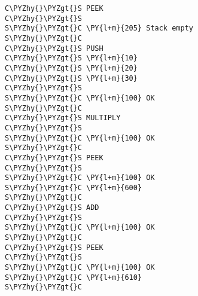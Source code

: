 \begin{Verbatim}[commandchars=\\\{\}]
C\PYZhy{}\PYZgt{}S PEEK
C\PYZhy{}\PYZgt{}S
S\PYZhy{}\PYZgt{}C \PY{l+m}{205} Stack empty
S\PYZhy{}\PYZgt{}C
C\PYZhy{}\PYZgt{}S PUSH  
C\PYZhy{}\PYZgt{}S \PY{l+m}{10}
C\PYZhy{}\PYZgt{}S \PY{l+m}{20}
C\PYZhy{}\PYZgt{}S \PY{l+m}{30}
C\PYZhy{}\PYZgt{}S
S\PYZhy{}\PYZgt{}C \PY{l+m}{100} OK
S\PYZhy{}\PYZgt{}C
C\PYZhy{}\PYZgt{}S MULTIPLY
C\PYZhy{}\PYZgt{}S
S\PYZhy{}\PYZgt{}C \PY{l+m}{100} OK
S\PYZhy{}\PYZgt{}C
C\PYZhy{}\PYZgt{}S PEEK
C\PYZhy{}\PYZgt{}S
S\PYZhy{}\PYZgt{}C \PY{l+m}{100} OK
S\PYZhy{}\PYZgt{}C \PY{l+m}{600}
S\PYZhy{}\PYZgt{}C
C\PYZhy{}\PYZgt{}S ADD
C\PYZhy{}\PYZgt{}S
S\PYZhy{}\PYZgt{}C \PY{l+m}{100} OK
S\PYZhy{}\PYZgt{}C
C\PYZhy{}\PYZgt{}S PEEK
C\PYZhy{}\PYZgt{}S
S\PYZhy{}\PYZgt{}C \PY{l+m}{100} OK
S\PYZhy{}\PYZgt{}C \PY{l+m}{610}
S\PYZhy{}\PYZgt{}C
\end{Verbatim}

